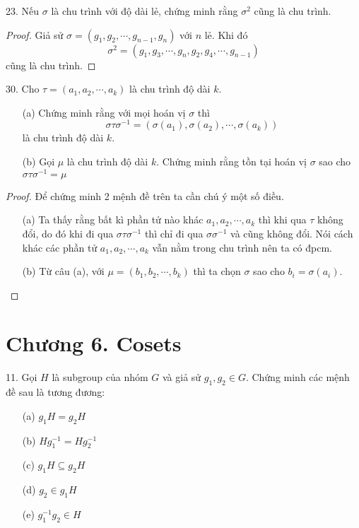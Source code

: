23. Nếu $\sigma$ là chu trình với độ dài lẻ, chứng minh rằng $\sigma^2$ cũng là chu trình.
\begin{proof}
    Giả sử $\sigma = (g_1, g_2, \cdots, g_{n-1}, g_n)$ với $n$ lẻ. 
    Khi đó \[\sigma^2 = (g_1, g_3, \cdots, g_n, g_2, g_4, \cdots, g_{n-1})\] cũng là chu trình.
\end{proof}

30. Cho $\tau = (a_1, a_2, \cdots, a_k)$ là chu trình độ dài $k$.

\begin{enumerate}
    \item[(a)] Chứng minh rằng với mọi hoán vị $\sigma$ thì \[ \sigma \tau \sigma^{-1} = (\sigma(a_1), \sigma(a_2), \cdots, \sigma(a_k)) \] là chu trình độ dài $k$.
    \item[(b)] Gọi $\mu$ là chu trình độ dài $k$. Chứng minh rằng tồn tại hoán vị $\sigma$ sao cho $\sigma \tau \sigma^{-1} = \mu$
\end{enumerate}

\begin{proof}
    Để chứng minh 2 mệnh đề trên ta cần chú ý một số điều.

    \begin{enumerate}
        \item [(a)] Ta thấy rằng bất kì phần tử nào khác $a_1, a_2, \cdots, a_k$ thì khi qua $\tau$ không đổi, do đó khi đi qua $\sigma \tau \sigma^{-1}$ thì chỉ đi qua $\sigma \sigma^{-1}$ và cũng không đổi. Nói cách khác các phần tử $a_1, a_2, \cdots, a_k$ vẫn nằm trong chu trình nên ta có đpcm.
        \item [(b)] Từ câu (a), với $\mu = (b_1, b_2, \cdots, b_k)$ thì ta chọn $\sigma$ sao cho $b_i = \sigma(a_i)$.
    \end{enumerate}
\end{proof}

\section*{Chương 6. Cosets}

11. Gọi $H$ là subgroup của nhóm $G$ và giả sử $g_1, g_2 \in G$. Chứng minh các mệnh đề sau là tương đương:

\begin{itemize}
    \item[(a)] $g_1 H = g_2 H$
    \item[(b)] $H g_1^{-1} = H g_2^{-1}$
    \item[(c)] $g_1 H \subseteq g_2 H$
    \item[(d)] $g_2 \in g_1 H$
    \item[(e)] $g_1^{-1} g_2 \in H$ 
\end{itemize}

